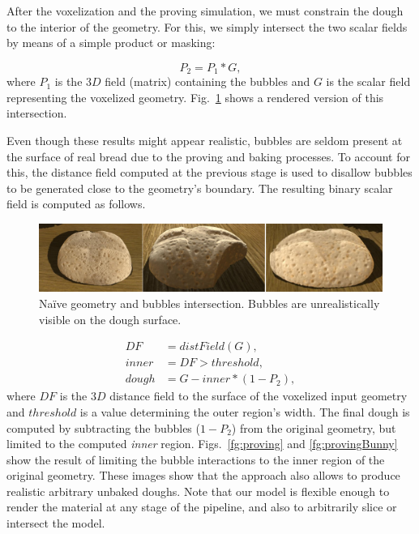 \documentclass[spanish,a4paper,11pt,oneside,links]{report}
\begin{document}
After the voxelization and the proving simulation, we must constrain the dough to the interior of the geometry. 
For this, we simply intersect the two scalar fields by means of a simple product or masking:

\begin{equation*}
P_{2} = P_{1} * G,
\end{equation*}
%
where $P_{1}$ is the $3D$ field (matrix) containing the bubbles and $G$ is the scalar field representing the voxelized geometry. 
Fig.~\ref{fg:intersectProblem} shows a rendered version of this intersection.

Even though these results might appear realistic, bubbles are seldom present at the surface of real bread due to the proving and baking processes. 
To account for this, the distance field computed at the previous stage is used to disallow bubbles to be generated close to the geometry's boundary. 
The resulting binary scalar field is computed as follows.

\begin{figure}
\includegraphics[width=15cm]{figures/intersectProblem}
\caption{Na\"ive geometry and bubbles intersection. Bubbles are unrealistically visible on the dough surface.}
\label{fg:intersectProblem}
\end{figure}

\begin{align*}
DF    &= distField(G),\\
inner &= DF > threshold,\\
dough &= G - inner*(1-P_{2}),
\end{align*}
%
where $DF$ is the $3D$ distance field to the surface of the voxelized input geometry and $threshold$ is a value determining the outer region's width.
The final dough is computed by subtracting the bubbles ($1-P_{2}$) from the original geometry, but limited to the computed {\em inner} region. Figs.~\ref{fg:proving} and \ref{fg:provingBunny} show the result of limiting the bubble interactions to the inner region of the original geometry.
These images show that the approach also allows to produce realistic arbitrary unbaked doughs.
Note that our model is flexible enough to render the material at any stage of the pipeline, and also to arbitrarily slice or intersect the model.
\end{document}
